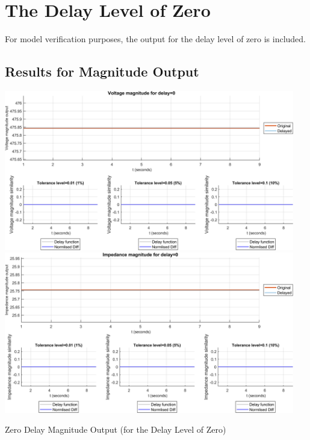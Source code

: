 \section{The Delay Level of Zero}
For model verification purposes, the output for the delay level of zero is included.
\newpage \newpage \subsection{Results for Magnitude Output}
\begin{floatingfigure}[p]{\textwidth}
    \includegraphics[width=0.95\textwidth]{PMUsim-figures/DelayOf_0/Zero_vMagnitude.png}    
    \label{fig:PMUsim_Zero_vMagnitude}
    \includegraphics[width=0.95\textwidth]{PMUsim-figures/DelayOf_0/Zero_iMagnitude.png}    
    \caption{Zero Delay Magnitude Output (for the Delay Level of Zero)}
    \label{fig:PMUsim_Zero_Magnitude}
\end{floatingfigure}
\begin{small}
\end{small}

